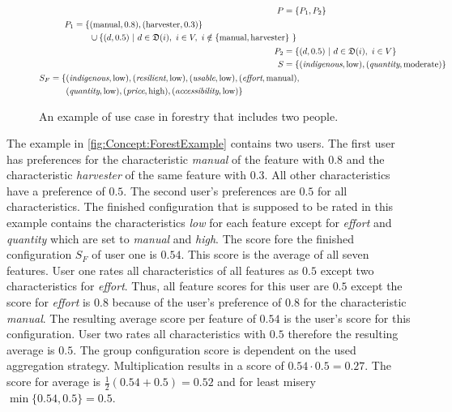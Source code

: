 \begin{figure}[htb]
\begin{mdframed}[
        nobreak=true,
        frametitle={Example for Forestry Use Case},
        linecolor=black, 
        frametitlerulecolor=black, 
        frametitlebackgroundcolor=gray!5
    ]
\begin{align}
            P = \{ & P_1, P_2\} \notag\\
            \begin{split}
                P_1 = \{ & (\text{manual}, 0.8), (\text{harvester}, 0.3) \} \\ 
                & \cup \{ (d,0.5)\ |\ d \in \mathfrak{D}(i),\ i \in V,\ i \notin \{ \text{manual}, \text{harvester}\} \ \} \ 
            \end{split} \notag \\
            P_2 = \{ & (d,0.5)\ |\ d \in \mathfrak{D}(i),\ i \in V \} \notag \\
            S  =  \{ & (\textit{indigenous}, \text{low}), (\textit{quantity}, \text{moderate}) \} \notag \\
            \begin{split}
            S_F  =  \{ & (\textit{indigenous}, \text{low}), (\textit{resilient}, \text{low}), (\textit{usable},\text{low}), (\textit{effort}, \text{manual}), \\
            & (\textit{quantity}, \text{low}), (\textit{price},\text{high}),(\textit{accessibility}, \text{low}) \} 
            \end{split} \notag
        \end{align}
    \end{mdframed}
    \caption[Forestry Use Case]{An example of use case in forestry that includes two people.}
    \label{fig:Concept:ForestExample}
\end{figure}

The example in \autoref{fig:Concept:ForestExample} contains two users. The first user has preferences for the characteristic \emph{manual} of the feature with $0.8$ and the characteristic \emph{harvester} of the same feature with $0.3$. All other characteristics have a preference of $0.5$. The second user's preferences are $0.5$ for all characteristics. The finished configuration that is supposed to be rated in this example contains the characteristics \emph{low} for each feature except for \emph{effort} and \emph{quantity} which are set to \emph{manual} and \emph{high}. The score fore the finished configuration $S_F$ of user one is $0.54$. This score is the average of all seven features. User one rates all characteristics of all features as $0.5$ except two characteristics for \emph{effort}. Thus, all feature scores for this user are $0.5$ except the score for \emph{effort} is $0.8$ because of the user's preference of $0.8$ for the characteristic \emph{manual}. The resulting average score per feature of $0.54$ is the user's score for this configuration. User two rates all characteristics with $0.5$ therefore the resulting average is $0.5$.
The group configuration score is dependent on the used aggregation strategy. Multiplication results in a score of $0.54 \cdot 0.5 = 0.27$. The score for average is $\frac{1}{2}(0.54 + 0.5) = 0.52$ and for least misery $\min \{0.54, 0.5\} = 0.5$.


